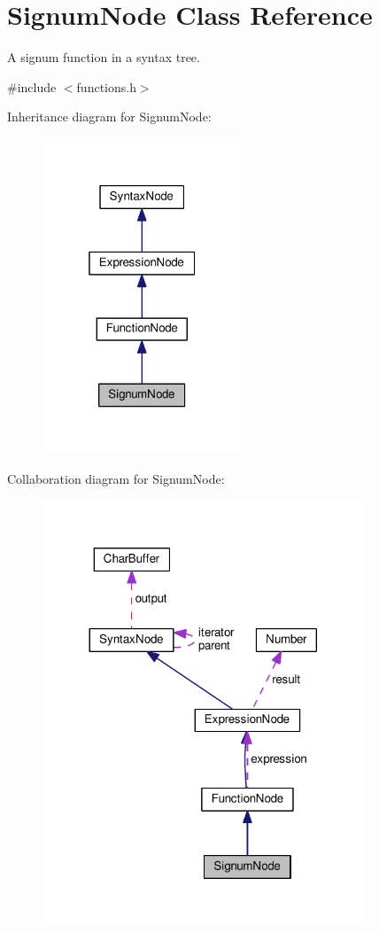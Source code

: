 \hypertarget{classSignumNode}{}\section{Signum\+Node Class Reference}
\label{classSignumNode}


A signum function in a syntax tree.  




{\ttfamily \#include $<$functions.\+h$>$}



Inheritance diagram for Signum\+Node\+:\nopagebreak
\begin{figure}[H]
\begin{center}
\leavevmode
\includegraphics[width=169pt]{classSignumNode__inherit__graph}
\end{center}
\end{figure}


Collaboration diagram for Signum\+Node\+:\nopagebreak
\begin{figure}[H]
\begin{center}
\leavevmode
\includegraphics[width=272pt]{classSignumNode__coll__graph}
\end{center}
\end{figure}
